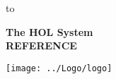 

\begin{titlepage}
\null\vskip-47pt
\hbox to 

\setcounter{page}{1}                      %

\vspace*{60mm}


\begin{center}
 {\Huge\bf The HOL System}\\[0.4cm]
{\LARGE\bf REFERENCE}\\[2.5cm]
\end{center}

\begin{center}
\texttt{[image: ../Logo/logo]}
\end{center}

\vfill
\end{titlepage}

\thispagestyle{empty}
\mbox{}
\newpage

